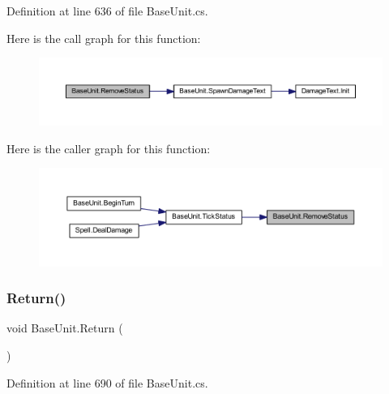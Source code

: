 Definition at line 636 of file Base\+Unit.\+cs.

Here is the call graph for this function\+:
\nopagebreak
\begin{figure}[H]
\begin{center}
\leavevmode
\includegraphics[width=350pt]{class_base_unit_a15cf13fa9b4b776f474ad03b42939139_cgraph}
\end{center}
\end{figure}
Here is the caller graph for this function\+:
\nopagebreak
\begin{figure}[H]
\begin{center}
\leavevmode
\includegraphics[width=350pt]{class_base_unit_a15cf13fa9b4b776f474ad03b42939139_icgraph}
\end{center}
\end{figure}
\mbox{\label{class_base_unit_a3091e5ab7a6bd3488f9c0987208a1f4d}} 
\subsubsection{\texorpdfstring{Return()}{Return()}}
{\footnotesize\ttfamily void Base\+Unit.\+Return (\begin{DoxyParamCaption}{ }\end{DoxyParamCaption})}



Definition at line 690 of file Base\+Unit.\+cs.

